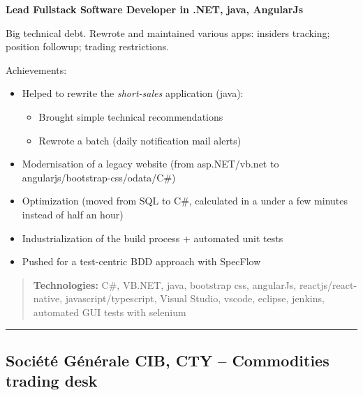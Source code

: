 \documentclass[
]{article}
\providecommand{\tightlist}{%
  \setlength{\itemsep}{0pt}\setlength{\parskip}{0pt}}
\begin{document}
\textbf{Lead Fullstack Software Developer in .NET, java, AngularJs}

Big technical debt. Rewrote and maintained various apps: insiders
tracking; position followup; trading restrictions.

Achievements:

\begin{itemize}
\tightlist
\item
  Helped to rewrite the \emph{short-sales} application (java):

  \begin{itemize}
  \tightlist
  \item
    Brought simple technical recommendations
  \item
    Rewrote a batch (daily notification mail alerts)
  \end{itemize}
\item
  Modernisation of a legacy website (from asp.NET/vb.net to
  angularjs/bootstrap-css/odata/C\#)
\item
  Optimization (moved from SQL to C\#, calculated in a under a few
  minutes instead of half an hour)
\item
  Industrialization of the build process + automated unit tests
\item
  Pushed for a test-centric BDD approach with SpecFlow
\end{itemize}

\begin{quote}
\textbf{Technologies:} C\#, VB.NET, java, bootstrap css, angularJs,
reactjs/react-native, javascript/typescript, Visual Studio, vscode,
eclipse, jenkins, automated GUI tests with selenium
\end{quote}

\begin{center}\rule{0.5\linewidth}{\linethickness}\end{center}

\hypertarget{sociuxe9tuxe9-guxe9nuxe9rale-cib-cty-commodities-trading-desk-082011---052014-3yr}{%
\subsection{\texorpdfstring{Société Générale CIB, CTY -- Commodities
trading desk \hfill{}}{Société Générale CIB, CTY -- Commodities trading desk 08/2011 - 05/2014 (\textasciitilde3yr)}}\label{sociuxe9tuxe9-guxe9nuxe9rale-cib-cty-commodities-trading-desk-082011---052014-3yr}}
\end{document}

